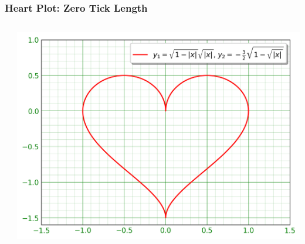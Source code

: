 \documentclass[xcolor={svgnames}]{beamer}
\newcommand{\pyfile}[2][]{}
\begin{document}
\begin{frame}[t,fragile]
    \frametitle{Heart Plot: Zero Tick Length}
    \vspace{-2mm}
    \begin{columns}[T]
        \begin{column}{0.47\textwidth}
            \pyfile[style=tiny,linerange=30]{examples/heart-5.py}
        \end{column}
        \begin{column}{0.53\textwidth}
            \includegraphics[width=\textwidth]{img/heart-5.png}
        \end{column}
    \end{columns}
\end{frame}
\end{document}
